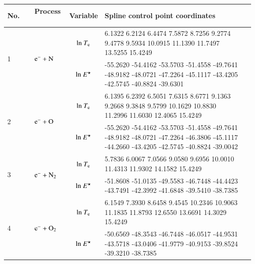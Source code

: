 \begin{table}[!htbp]
  \center{}
  \begin{threeparttable}
    \label{tab:spline_tab}
    \begin{tabular*}{\textwidth}{l@{\extracolsep{\fill}}lcll}
    \toprule
   No.~~ & Process ~& Variable & Spline control point coordinates  \\
        \midrule

        

  \multirow{2}{*}{1} &  \multirow{2}{*}{ $\rm e^- + N  $   } & ${\rm ln}~T_{\rm e}$  & \tiny      6.1322    6.2124    6.4474    7.5872    8.7256    9.2774    9.4778    9.5934   10.0915   11.1390   11.7497   13.5255   15.4249
 \\
  &  & ${\rm ln}~E^\star$     & \tiny -55.2620  -54.4162  -53.5703  -51.4558  -49.7641  -48.9182  -48.0721  -47.2264  -45.1117  -43.4205  -42.5745  -40.8824  -39.6301\\     
  \midrule  
      
  \multirow{2}{*}{2} &  \multirow{2}{*}{ $\rm e^- + O  $   } & ${\rm ln}~T_{\rm e}$  & \tiny    6.1395    6.2392    6.5051    7.6315    8.6771    9.1363    9.2668    9.3848    9.5799   10.1629   10.8830   11.2996   11.6030   12.4065   15.4249 \\
  &  & ${\rm ln}~E^\star$     & \tiny  -55.2620  -54.4162  -53.5703  -51.4558  -49.7641  -48.9182  -48.0721  -47.2264  -46.3806  -45.1117  -44.2660  -43.4205  -42.5745  -40.8824  -39.0042\\     
  \midrule    
  
  \multirow{2}{*}{3} &  \multirow{2}{*}{ $\rm e^- + N_2 $   } & ${\rm ln}~T_{\rm e}$  & \tiny          5.7836    6.0067    7.0566    9.0580    9.6956   10.0010   11.4313   11.9302   14.1582   15.4249
\\
  &  & ${\rm ln}~E^\star$     & \tiny       -51.8608  -51.0135  -49.5583  -46.7448  -44.4423  -43.7491  -42.3992  -41.6848  -39.5410  -38.7385
\\
  \midrule  
  
  \multirow{2}{*}{4} &  \multirow{2}{*}{ $\rm e^- + O_2  $   } & ${\rm ln}~T_{\rm e}$  & \tiny         6.1549    7.3930    8.6458    9.4545   10.2346   10.9063   11.1835   11.8793   12.6550   13.6691   14.3029   15.4249 \\ 

  &  & ${\rm ln}~E^\star$     & \tiny      -50.6569  -48.3543  -46.7448  -46.0517  -44.9531  -43.5718  -43.0406  -41.9779  -40.9153  -39.8524  -39.3210  -38.7385


\end{tabular*}
\end{threeparttable}
\end{table}
